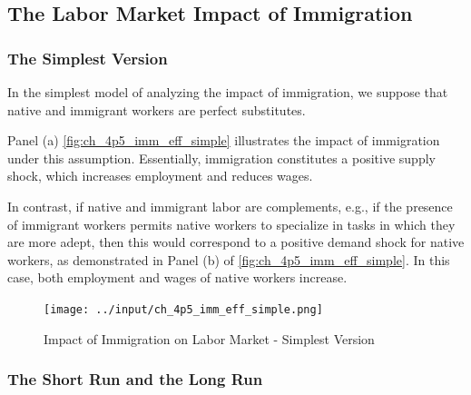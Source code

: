 \subsection{The Labor Market Impact of Immigration}

\subsubsection{The Simplest Version}

In the simplest model of analyzing the 
impact of immigration, we suppose that 
native and immigrant workers are perfect substitutes.

Panel (a) \autoref{fig:ch_4p5_imm_eff_simple} 
illustrates the impact of immigration 
under this assumption. Essentially,
immigration constitutes a positive 
supply shock, which increases employment 
and reduces wages.

In contrast, if native and immigrant labor 
are complements, e.g., if the presence of 
immigrant workers permits native workers 
to specialize in tasks in which they are more adept,
then this would correspond to a positive demand shock for native workers, 
as demonstrated in Panel (b) of \autoref{fig:ch_4p5_imm_eff_simple}.
In this case, both employment and wages
of native workers increase.


\FloatBarrier

\begin{figure}[!htb]
    \centering
        \texttt{[image: ../input/ch\_4p5\_imm\_eff\_simple.png]}
    \caption{Impact of Immigration on Labor Market - Simplest Version}
    \label{fig:ch_4p5_imm_eff_simple}
\end{figure}

\FloatBarrier

\subsubsection{The Short Run and the Long Run}

